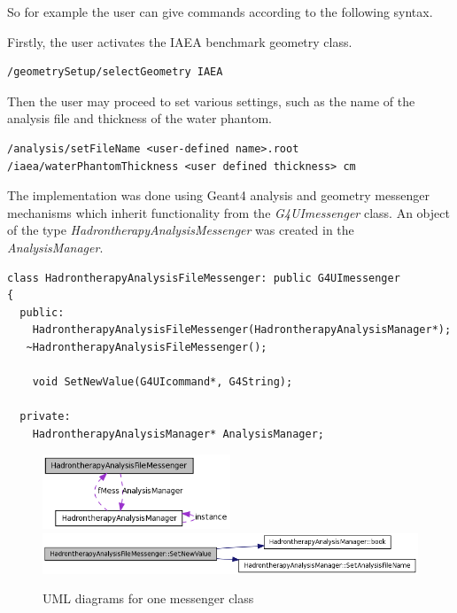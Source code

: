 So for example the user can give commands according to the following syntax.

Firstly, the user activates the IAEA benchmark geometry class.
\scriptsize
\begin{verbatim}
/geometrySetup/selectGeometry IAEA
\end{verbatim}
\normalsize
Then the user may proceed to set various settings, such as the name of the analysis file and thickness of the water phantom.
\scriptsize
\begin{verbatim}
/analysis/setFileName <user-defined name>.root
/iaea/waterPhantomThickness <user defined thickness> cm
\end{verbatim}
\normalsize

The implementation was done using Geant4 analysis and geometry messenger mechanisms which inherit functionality from the \textit{G4UImessenger} class. An object of the type \textit{HadrontherapyAnalysisMessenger} was created in the \textit{AnalysisManager}.


\scriptsize
\begin{verbatim}
class HadrontherapyAnalysisFileMessenger: public G4UImessenger
{
  public:
    HadrontherapyAnalysisFileMessenger(HadrontherapyAnalysisManager*);
   ~HadrontherapyAnalysisFileMessenger();
    
    void SetNewValue(G4UIcommand*, G4String);
    
  private:
    HadrontherapyAnalysisManager* AnalysisManager;
\end{verbatim}
\normalsize
\begin{figure}[!h] 
\begin{center}
\includegraphics[width=0.5\textwidth]{images/setFileNameMessenger_1.png}  
\\
\includegraphics[width=1.0\textwidth]{images/setFileNameMessenger_2.png}  
\caption{\label{fig:messengerUML} UML diagrams for one messenger class}
 
 \end{center}
 \end{figure}

